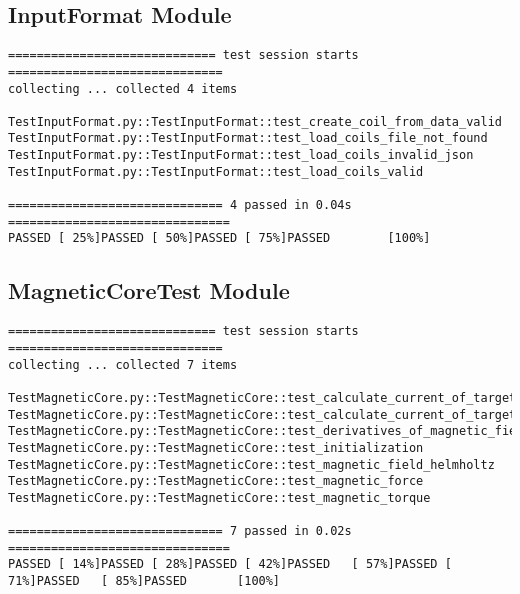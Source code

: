 \documentclass[12pt, titlepage]{article}
\begin{document}
\subsection{InputFormat Module}
\begin{small}
\begin{verbatim}
============================= test session starts ==============================
collecting ... collected 4 items

TestInputFormat.py::TestInputFormat::test_create_coil_from_data_valid 
TestInputFormat.py::TestInputFormat::test_load_coils_file_not_found 
TestInputFormat.py::TestInputFormat::test_load_coils_invalid_json 
TestInputFormat.py::TestInputFormat::test_load_coils_valid 

============================== 4 passed in 0.04s ===============================
PASSED [ 25%]PASSED [ 50%]PASSED [ 75%]PASSED        [100%]

\end{verbatim}
\end{small}

\subsection{MagneticCoreTest Module}
\begin{small}
\begin{verbatim}
============================= test session starts ==============================
collecting ... collected 7 items

TestMagneticCore.py::TestMagneticCore::test_calculate_current_of_target_force 
TestMagneticCore.py::TestMagneticCore::test_calculate_current_of_target_torque 
TestMagneticCore.py::TestMagneticCore::test_derivatives_of_magnetic_field_maxwell_at_center 
TestMagneticCore.py::TestMagneticCore::test_initialization 
TestMagneticCore.py::TestMagneticCore::test_magnetic_field_helmholtz 
TestMagneticCore.py::TestMagneticCore::test_magnetic_force 
TestMagneticCore.py::TestMagneticCore::test_magnetic_torque 

============================== 7 passed in 0.02s ===============================
PASSED [ 14%]PASSED [ 28%]PASSED [ 42%]PASSED	[ 57%]PASSED [ 71%]PASSED	[ 85%]PASSED       [100%]

\end{verbatim}
\end{small}
\end{document}
